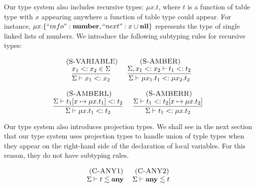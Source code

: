 Our type system also includes recursive types: $\mu x.t$,
where $t$ is a function of table type with $x$ appearing anywhere
a function of table type could appear.
For instance, $\mu x.\{``info":\mathbf{number}, ``next":x \cup \mathbf{nil}\}$
represents the type of single linked lists of numbers.
We introduce the following subtyping rules for recursive types:

\[
\begin{array}{c}
\begin{array}{c}
\; (\textsc{S-VARIABLE})\\
\dfrac{x_{1} <: x_{2} \in \Sigma}
      {\Sigma \vdash x_{1} <: x_{2}}
\end{array}
\;
\begin{array}{c}
\; (\textsc{S-AMBER})\\
\dfrac{\Sigma, x_{1} <: x_{2} \vdash t_{1} <: t_{2}}
      {\Sigma \vdash \mu x_{1}.t_{1} <: \mu x_{2}.t_{2}}
\end{array}
\\ \\
\begin{array}{c}
\; (\textsc{S-AMBERL})\\
\dfrac{\Sigma \vdash t_{1}[x \mapsto \mu x.t_{1}] <: t_{2}}
      {\Sigma \vdash \mu x.t_{1} <: t_{2}}
\end{array}
\;
\begin{array}{c}
\; (\textsc{S-AMBERR})\\
\dfrac{\Sigma \vdash t_{1} <: t_{2}[x \mapsto \mu x.t_{2}]}
      {\Sigma \vdash t_{1} <: \mu x.t_{2}}
\end{array}
\end{array}
\]

Our type system also introduces projection types.
We shall see in the next section that our type system uses
projection types to handle union of typle types when they
appear on the right-hand side of the declaration of local variables.
For this reason, they do not have subtyping rules.

\[
\begin{array}{c}
\begin{array}{c}
\; (\textsc{C-ANY1})\\
\Sigma \vdash t \lesssim \mathbf{any}
\end{array}
\;
\begin{array}{c}
\; (\textsc{C-ANY2})\\
\Sigma \vdash \mathbf{any} \lesssim t
\end{array}
\end{array}
\]

